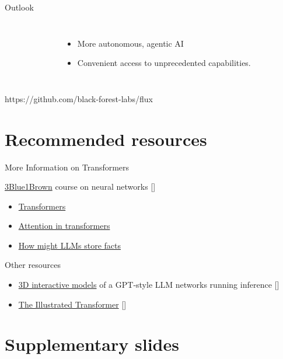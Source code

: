 \documentclass[10pt]{beamer}
\newcommand{\creditdark}[1]{{\par \raggedleft \scriptsize \mdseries \color{scMGray} #1 \par}}
\newcommand{\citeme}[1]{{\xspace\color{scAqua} \scriptsize [\cite{#1}]}}
\begin{document}
\begin{frame}[standout]{Outlook}
\begin{columns}[T,onlytextwidth]
\begin{figure}
		\end{figure}
			\begin{itemize}
				\item More autonomous, agentic AI
				\item Convenient access to unprecedented capabilities.
			\end{itemize}
	\end{columns}
\creditdark{https://github.com/black-forest-labs/flux}
\end{frame}

\appendix

\section{Recommended resources}

\begin{frame}{More Information on Transformers}
	\begin{block}{\href{https://www.youtube.com/playlist?list=PLZHQObOWTQDNU6R1_67000Dx_ZCJB-3pi}{3Blue1Brown} course on neural networks\citeme{Sanderson2024}}
	\begin{itemize}
		\item \href{https://www.youtube.com/watch?v=wjZofJX0v4M&list=PLZHQObOWTQDNU6R1_67000Dx_ZCJB-3pi&index=6}{Transformers}
		\item \href{https://www.youtube.com/watch?v=eMlx5fFNoYc&list=PLZHQObOWTQDNU6R1_67000Dx_ZCJB-3pi&index=7}{Attention in transformers}
		\item \href{https://www.youtube.com/watch?v=9-Jl0dxWQs8&list=PLZHQObOWTQDNU6R1_67000Dx_ZCJB-3pi&index=8}{How might LLMs store facts}
	\end{itemize}
\end{block}
	\begin{block}{Other resources}
	\begin{itemize}
		\item \href{https://bbycroft.net/llm}{3D interactive models} of a GPT-style LLM networks running inference\citeme{Bycroft2023}
		\item \href{http://jalammar.github.io/illustrated-transformer/}{The Illustrated Transformer}\citeme{Alammar2018}
	\end{itemize}
	\end{block}
\end{frame}

\section{Supplementary slides}
\end{document}
